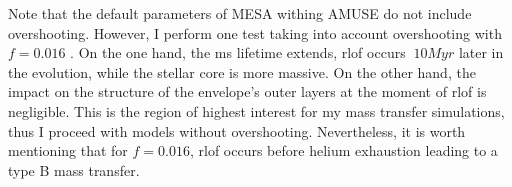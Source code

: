 Note that the default parameters of MESA withing AMUSE do not include overshooting. However, I perform one test taking into account overshooting with $f=0.016$ \citep{herwig2000evolution}. On the one hand, the \ac{ms} lifetime extends, \ac{rlof} occurs $~10Myr$ later in the evolution, while the stellar core is more massive. On the other hand, the impact on the structure of the envelope's outer layers at the moment of \ac{rlof} is negligible. This is the region of highest interest for my mass transfer simulations, thus I proceed with models without overshooting. Nevertheless, it is worth mentioning that for $f=0.016$, \ac{rlof} occurs before helium exhaustion leading to a type B mass transfer.
